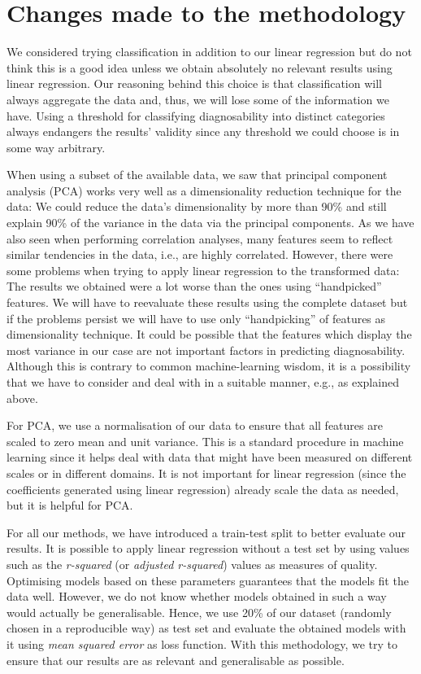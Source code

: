 \documentclass{scrartcl}
\begin{document}
\section{Changes made to the methodology}

We considered trying classification in addition to our linear regression but do
not think this is a good idea unless we obtain absolutely no relevant results
using linear regression. Our reasoning behind this choice is that classification
will always aggregate the data and, thus, we will lose some of the information
we have. Using a threshold for classifying diagnosability into distinct
categories always endangers the results' validity since any threshold we could
choose is in some way arbitrary.

When using a subset of the available data, we saw that principal component
analysis (PCA) works very well as a dimensionality reduction technique for the
data: We could reduce the data's dimensionality by more than 90\% and still
explain 90\% of the variance in the data via the principal components. As we
have also seen when performing correlation analyses, many features seem to
reflect similar tendencies in the data, i.e., are highly correlated. However,
there were some problems when trying to apply linear regression to the
transformed data: The results we obtained were a lot worse than the ones using
\enquote{handpicked} features. We will have to reevaluate these results using
the complete dataset but if the problems persist we will have to use only
\enquote{handpicking} of features as dimensionality technique. It could be
possible that the features which display the most variance in our case are not
important factors in predicting diagnosability. Although this is contrary to
common machine-learning wisdom, it is a possibility that we have to consider and
deal with in a suitable manner, e.g., as explained above.

For PCA, we use a normalisation of our data to ensure that all features are
scaled to zero mean and unit variance. This is a  standard procedure in machine
learning since it helps deal with data that might have been measured on
different scales or in different domains. It is not important for linear
regression (since the coefficients generated using linear regression) already
scale the data as needed, but it is helpful for PCA.

For all our methods, we have introduced a train-test split to better evaluate
our results. It is possible to apply linear regression without a
test set by using values such as the \emph{r-squared} (or \emph{adjusted
r-squared}) values as measures of quality. Optimising models based on these
parameters guarantees that the models fit the data well. However, we do not know
whether models obtained in such a way would actually be generalisable. Hence, we
use 20\% of our dataset (randomly chosen in a reproducible way) as test set and
evaluate the obtained models with it using \emph{mean squared error} as loss
function. With this methodology, we try to ensure that our results are as
relevant and generalisable as possible.
\end{document}
